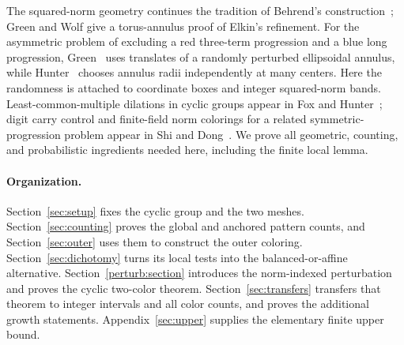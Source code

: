 The squared-norm geometry continues the tradition of
Behrend's construction~\cite{behrend1946}; Green and Wolf
\cite{greenWolf2010} give a torus-annulus proof of Elkin's refinement.
For the asymmetric problem of excluding a red three-term progression
and a blue long progression, Green~\cite{green2022} uses translates
of a randomly perturbed ellipsoidal annulus, while
Hunter~\cite{hunter2022} chooses annulus radii independently at many centers.
Here the randomness is attached to coordinate boxes and integer
squared-norm bands. Least-common-multiple dilations in cyclic groups
appear in Fox and Hunter~\cite{foxHunter2026}; digit carry control and
finite-field norm colorings for a related symmetric-progression problem
appear in Shi and Dong~\cite{shiDong2026}.
We prove all geometric, counting, and probabilistic ingredients needed
here, including the finite local lemma.

\paragraph{Organization.}
Section~\ref{sec:setup} fixes the cyclic group and the two meshes.
Section~\ref{sec:counting} proves the global and anchored pattern counts,
and Section~\ref{sec:outer} uses them to construct the outer coloring.
Section~\ref{sec:dichotomy} turns its local tests into the balanced-or-affine
alternative. Section~\ref{perturb:section} introduces the norm-indexed
perturbation and proves the cyclic two-color theorem.
Section~\ref{sec:transfers} transfers that theorem to integer intervals
and all color counts, and proves the additional growth statements.
Appendix~\ref{sec:upper} supplies the elementary finite upper bound.
